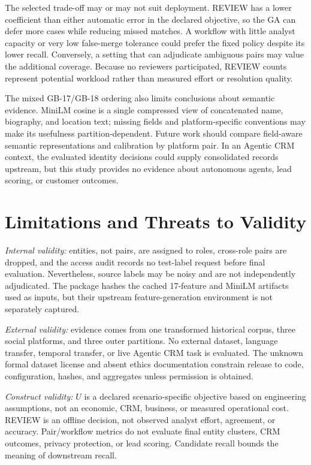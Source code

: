 \documentclass[conference]{IEEEtran}
\begin{document}
The selected trade-off may or may not suit deployment. REVIEW has a lower coefficient than either automatic error in the declared objective, so the GA can defer more cases while reducing missed matches. A workflow with little analyst capacity or very low false-merge tolerance could prefer the fixed policy despite its lower recall. Conversely, a setting that can adjudicate ambiguous pairs may value the additional coverage. Because no reviewers participated, REVIEW counts represent potential workload rather than measured effort or resolution quality.

The mixed GB-17/GB-18 ordering also limits conclusions about semantic evidence. MiniLM cosine is a single compressed view of concatenated name, biography, and location text; missing fields and platform-specific conventions may make its usefulness partition-dependent. Future work should compare field-aware semantic representations and calibration by platform pair. In an Agentic CRM context, the evaluated identity decisions could supply consolidated records upstream, but this study provides no evidence about autonomous agents, lead scoring, or customer outcomes.

\section{Limitations and Threats to Validity}
\emph{Internal validity:} entities, not pairs, are assigned to roles, cross-role pairs are dropped, and the access audit records no test-label request before final evaluation. Nevertheless, source labels may be noisy and are not independently adjudicated. The package hashes the cached 17-feature and MiniLM artifacts used as inputs, but their upstream feature-generation environment is not separately captured.

\emph{External validity:} evidence comes from one transformed historical corpus, three social platforms, and three outer partitions. No external dataset, language transfer, temporal transfer, or live Agentic CRM task is evaluated. The unknown formal dataset license and absent ethics documentation constrain release to code, configuration, hashes, and aggregates unless permission is obtained.

\emph{Construct validity:} $U$ is a declared scenario-specific objective based on engineering assumptions, not an economic, CRM, business, or measured operational cost. REVIEW is an offline decision, not observed analyst effort, agreement, or accuracy. Pair/workflow metrics do not evaluate final entity clusters, CRM outcomes, privacy protection, or lead scoring. Candidate recall bounds the meaning of downstream recall.
\end{document}

